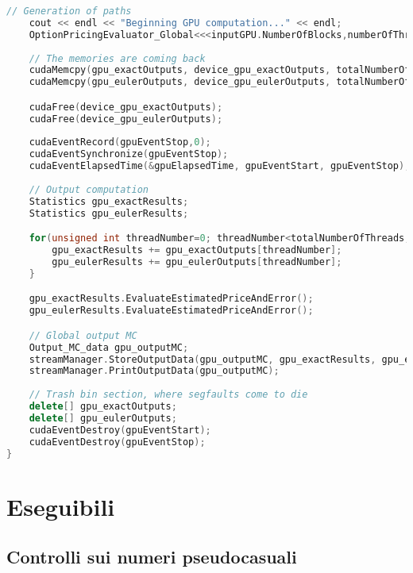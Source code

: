 \begin{lstlisting}[language=C++, caption={\texttt{libraries/CoreLibraries/SupportFunctions/Support\_functions.cu}}]
	// Generation of paths
	cout << endl << "Beginning GPU computation..." << endl;
	OptionPricingEvaluator_Global<<<inputGPU.NumberOfBlocks,numberOfThreadsPerBlock>>>(inputGPU, inputOption, inputMarket, inputMC, device_gpu_exactOutputs, device_gpu_eulerOutputs, seed);
	
	// The memories are coming back
	cudaMemcpy(gpu_exactOutputs, device_gpu_exactOutputs, totalNumberOfThreads*sizeof(Statistics), cudaMemcpyDeviceToHost);
	cudaMemcpy(gpu_eulerOutputs, device_gpu_eulerOutputs, totalNumberOfThreads*sizeof(Statistics), cudaMemcpyDeviceToHost);

	cudaFree(device_gpu_exactOutputs);
	cudaFree(device_gpu_eulerOutputs);
	
	cudaEventRecord(gpuEventStop,0);
	cudaEventSynchronize(gpuEventStop);
	cudaEventElapsedTime(&gpuElapsedTime, gpuEventStart, gpuEventStop);
	
	// Output computation
	Statistics gpu_exactResults;
	Statistics gpu_eulerResults;

	for(unsigned int threadNumber=0; threadNumber<totalNumberOfThreads; ++threadNumber){
		gpu_exactResults += gpu_exactOutputs[threadNumber];
		gpu_eulerResults += gpu_eulerOutputs[threadNumber];
	}

	gpu_exactResults.EvaluateEstimatedPriceAndError();
	gpu_eulerResults.EvaluateEstimatedPriceAndError();

	// Global output MC
	Output_MC_data gpu_outputMC;
	streamManager.StoreOutputData(gpu_outputMC, gpu_exactResults, gpu_eulerResults, gpuElapsedTime, 'd');
	streamManager.PrintOutputData(gpu_outputMC);
	
	// Trash bin section, where segfaults come to die
	delete[] gpu_exactOutputs;
	delete[] gpu_eulerOutputs;
	cudaEventDestroy(gpuEventStart);
	cudaEventDestroy(gpuEventStop);
}
\end{lstlisting}

\section{Eseguibili}
\lipsum[1]

\subsection{Controlli sui numeri pseudocasuali}
\lipsum[1-3]

